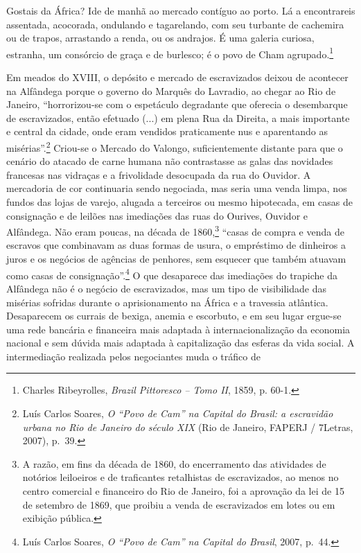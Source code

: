 Gostais da África? Ide de manhã ao mercado contíguo ao porto. Lá a
encontrareis assentada, acocorada, ondulando e tagarelando, com seu
turbante de cachemira ou de trapos, arrastando a renda, ou os andrajos.
É uma galeria curiosa, estranha, um consórcio de graça e de burlesco; é
o povo de Cham agrupado.\footnote{Charles Ribeyrolles, \emph{Brazil
  Pittoresco -- Tomo II}, 1859, p. 60-1.}

Em meados do XVIII, o depósito e mercado de escravizados deixou de
acontecer na Alfândega porque o governo do Marquês do Lavradio, ao
chegar ao Rio de Janeiro, ``horrorizou-se com o espetáculo degradante
que oferecia o desembarque de escravizados, então efetuado (...) em
plena Rua da Direita, a mais importante e central da cidade, onde eram
vendidos praticamente nus e aparentando as misérias''.\footnote{Luís
  Carlos Soares, \emph{O ``Povo de Cam'' na Capital do Brasil: a
  escravidão urbana no Rio de Janeiro do século XIX} (Rio de Janeiro,
  FAPERJ / 7Letras, 2007), p.~39.} Criou-se o Mercado do Valongo,
suficientemente distante para que o cenário do atacado de carne humana
não contrastasse as galas das novidades francesas nas vidraças e a
frivolidade desocupada da rua do Ouvidor. A mercadoria de cor
continuaria sendo negociada, mas seria uma venda limpa, nos fundos das
lojas de varejo, alugada a terceiros ou mesmo hipotecada, em casas de
consignação e de leilões nas imediações das ruas do Ourives, Ouvidor e
Alfândega. Não eram poucas, na década de 1860,\footnote{A razão, em fins
  da década de 1860, do encerramento das atividades de notórios
  leiloeiros e de traficantes retalhistas de escravizados, ao menos no
  centro comercial e financeiro do Rio de Janeiro, foi a aprovação da
  lei de 15 de setembro de 1869, que proibiu a venda de escravizados em
  lotes ou em exibição pública.} ``casas de compra e venda de escravos
que combinavam as duas formas de usura, o empréstimo de dinheiros a
juros e os negócios de agências de penhores, sem esquecer que também
atuavam como casas de consignação''.\footnote{Luís Carlos Soares,
  \emph{O ``Povo de Cam'' na Capital do Brasil}, 2007, p.~44.} O que
desaparece das imediações do trapiche da Alfândega não é o negócio de
escravizados, mas um tipo de visibilidade das misérias sofridas durante
o aprisionamento na África e a travessia atlântica. Desaparecem os
currais de bexiga, anemia e escorbuto, e em seu lugar ergue-se uma rede
bancária e financeira mais adaptada à internacionalização da economia
nacional e sem dúvida mais adaptada à capitalização das esferas da vida
social. A intermediação realizada pelos negociantes muda o tráfico de
